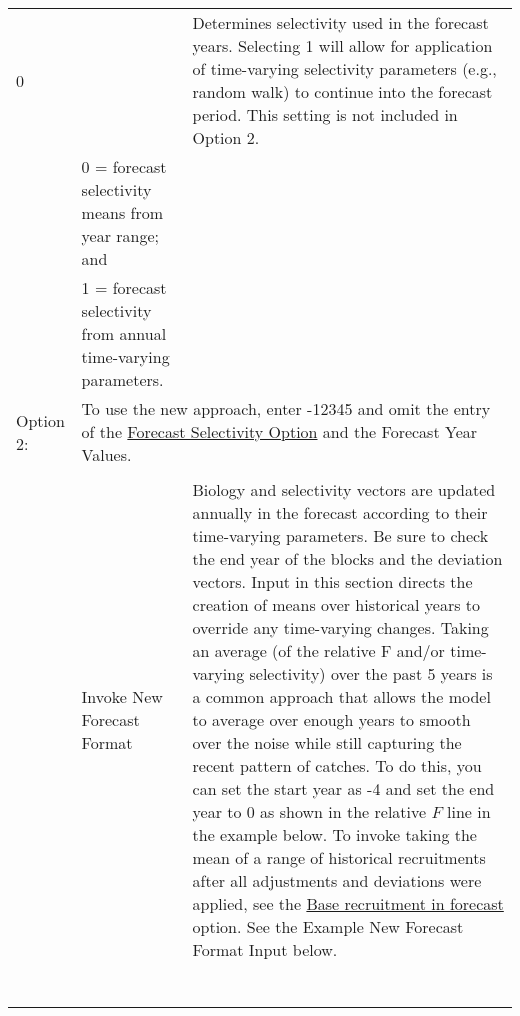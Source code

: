 \begin{landscape}
{\begin{longtable}{p{2cm} p{7cm} p{12cm}}
  0 & \raisebox{0.1\ht\strutbox}{\hypertarget{FcastSelectivity}{Forecast Selectivity Option}} & \multirow{1}{1cm}[-0.15cm]{\parbox{12cm}{Determines selectivity used in the forecast years. Selecting 1 will allow for application of time-varying selectivity parameters (e.g., random walk) to continue into the forecast period. This setting is not included in Option 2.}} \\
    & 0 = forecast selectivity means from year range; and & \\
    & 1 = forecast selectivity from annual time-varying parameters. & \\

  Option 2: & \multicolumn{2}{l}{\multirow{1}{1cm}[-0.15cm]{\parbox{18.5cm}{To use the new approach, enter -12345 and omit the entry of the \hyperlink{FcastSelectivity}{Forecast Selectivity Option} and the Forecast Year Values.}}} \Tstrut\Bstrut\\
  & & \\

  \pagebreak
  -12345 & Invoke New Forecast Format & \multirow{1}{1cm}[-0.15cm]{\parbox{12cm}{Biology and selectivity vectors are updated annually in the forecast according to their time-varying parameters. Be sure to check the end year of the blocks and the deviation vectors. Input in this section directs the creation of means over historical years to override any time-varying changes. Taking an average (of the relative F and/or time-varying selectivity) over the past 5 years is a common approach that allows the model to average over enough years to smooth over the noise while still capturing the recent pattern of catches. To do this, you can set the start year as -4 and set the end year to 0 as shown in the relative $F$ line in the example below. To invoke taking the mean of a range of historical recruitments after all adjustments and deviations were applied, see the \hyperlink{FcastRecruitment}{Base recruitment in forecast} option. See the Example New Forecast Format Input below.}} \Tstrut\Bstrut\\
   & & \\
   & & \\
   & & \\
   & & \Bstrut\\
   & & \Tstrut\Bstrut\\
   & & \Tstrut\Bstrut\\
   & & \Tstrut\Bstrut\\
  

\end{longtable}}
\end{landscape}
